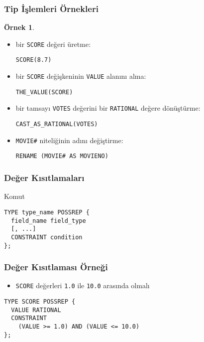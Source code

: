 \documentclass[dvipsnames]{beamer}
\theoremstyle{definition}
\theoremstyle{example}
\newtheorem{ornek}[theorem]{Örnek}
\theoremstyle{plain}
\begin{document}
\begin{frame}[fragile]
  \frametitle{Tip İşlemleri Örnekleri}

  \begin{ornek}
    \begin{itemize}
      \item bir \texttt{SCORE} değeri üretme:
      \begin{lstlisting}
SCORE(8.7)
      \end{lstlisting}

      \pause
      \item bir \texttt{SCORE} değişkeninin \texttt{VALUE} alanını alma:
      \begin{lstlisting}
THE_VALUE(SCORE)
      \end{lstlisting}

      \pause
      \item bir tamsayı \texttt{VOTES} değerini bir \texttt{RATIONAL} değere
        dönüştürme:
      \begin{lstlisting}
CAST_AS_RATIONAL(VOTES)
      \end{lstlisting}

      \pause
      \item \texttt{MOVIE\#} niteliğinin adını değiştirme:
      \begin{lstlisting}
RENAME (MOVIE# AS MOVIENO)
      \end{lstlisting}
    \end{itemize}
  \end{ornek}
\end{frame}

\begin{frame}[fragile]
  \frametitle{Değer Kısıtlamaları}

  \begin{block}{Komut}
    \begin{lstlisting}
TYPE type_name POSSREP {
  field_name field_type
  [, ...]
  CONSTRAINT condition
};
    \end{lstlisting}
  \end{block}
\end{frame}

\begin{frame}[fragile]
  \frametitle{Değer Kısıtlaması Örneği}

  \begin{example}
    \begin{itemize}
      \item \texttt{SCORE} değerleri \texttt{1.0} ile \texttt{10.0} arasında
        olmalı
    \end{itemize}

    \begin{lstlisting}
TYPE SCORE POSSREP {
  VALUE RATIONAL
  CONSTRAINT
    (VALUE >= 1.0) AND (VALUE <= 10.0)
};
    \end{lstlisting}
  \end{example}
\end{frame}
\end{document}
